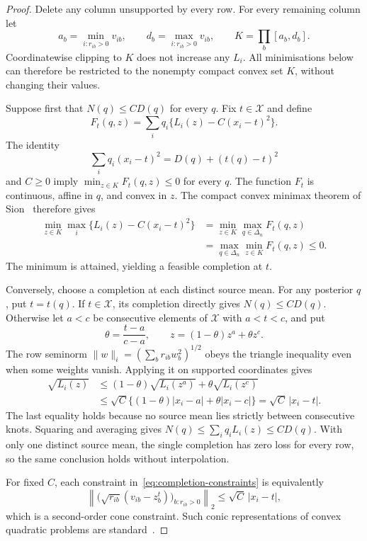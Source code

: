 \documentclass[11pt,a4paper]{article}
\begin{document}
\begin{proof}
Delete any column unsupported by every row. For every remaining column
let
\[
 a_b=\min_{i:r_{ib}>0}v_{ib},\qquad
 d_b=\max_{i:r_{ib}>0}v_{ib},\qquad
 K=\prod_b[a_b,d_b].
\]
Coordinatewise clipping to $K$ does not increase any $L_i$. All
minimisations below can therefore be restricted to the nonempty compact
convex set $K$, without changing their values.

Suppose first that $N(q)\leq CD(q)$ for every $q$. Fix $t\in\mathcal X$
and define
\[
 F_t(q,z)=\sum_iq_i\{L_i(z)-C(x_i-t)^2\}.
\]
The identity
\[
 \sum_iq_i(x_i-t)^2=D(q)+(t(q)-t)^2
\]
and $C\geq0$ imply $\min_{z\in K}F_t(q,z)\leq0$ for every $q$.
The function $F_t$ is continuous, affine in $q$, and convex in $z$.
The compact convex minimax theorem of Sion~\cite[Theorem 3.4]{Sion1958}
therefore gives
\begin{align*}
 \min_{z\in K}\max_i\{L_i(z)-C(x_i-t)^2\}
 &=\min_{z\in K}\max_{q\in\Delta_n}F_t(q,z)\\
 &=\max_{q\in\Delta_n}\min_{z\in K}F_t(q,z)\leq0.
\end{align*}
The minimum is attained, yielding a feasible completion at $t$.

Conversely, choose a completion at each distinct source mean. For any
posterior $q$, put $t=t(q)$. If $t\in\mathcal X$, its completion directly
gives $N(q)\leq CD(q)$. Otherwise let $a<c$ be consecutive elements of
$\mathcal X$ with $a<t<c$, and put
\[
 \theta=\frac{t-a}{c-a},\qquad
 z=(1-\theta)z^a+\theta z^c.
\]
The row seminorm $\|w\|_i=(\sum_b r_{ib}w_b^2)^{1/2}$ obeys the triangle
inequality even when some weights vanish. Applying it on supported
coordinates gives
\begin{align*}
 \sqrt{L_i(z)}
 &\leq(1-\theta)\sqrt{L_i(z^a)}+\theta\sqrt{L_i(z^c)}\\
 &\leq\sqrt C\{(1-\theta)|x_i-a|+\theta|x_i-c|\}
 =\sqrt C\,|x_i-t|.
\end{align*}
The last equality holds because no source mean lies strictly between
consecutive knots. Squaring and averaging gives
$N(q)\leq\sum_iq_iL_i(z)\leq CD(q)$. With only one distinct source mean,
the single completion has zero loss for every row, so the same
conclusion holds without interpolation.

For fixed $C$, each constraint in~\eqref{eq:completion-constraints} is
equivalently
\[
 \left\|\bigl(\sqrt{r_{ib}}(v_{ib}-z_b^t)\bigr)_{b:r_{ib}>0}\right\|_2
 \leq\sqrt C\,|x_i-t|,
\]
which is a second-order cone constraint. Such conic representations of
convex quadratic problems are standard~\cite[Section 2.1]{Lobo1998}.
\end{proof}
\end{document}
